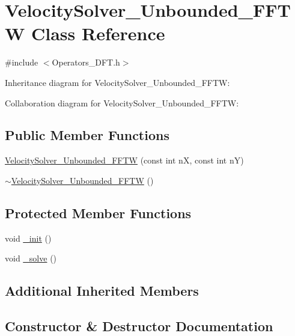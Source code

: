 \hypertarget{class_velocity_solver___unbounded___f_f_t_w}{}\section{Velocity\+Solver\+\_\+\+Unbounded\+\_\+\+F\+F\+T\+W Class Reference}
\label{class_velocity_solver___unbounded___f_f_t_w}


{\ttfamily \#include $<$Operators\+\_\+\+D\+F\+T.\+h$>$}



Inheritance diagram for Velocity\+Solver\+\_\+\+Unbounded\+\_\+\+F\+F\+T\+W\+:


Collaboration diagram for Velocity\+Solver\+\_\+\+Unbounded\+\_\+\+F\+F\+T\+W\+:
\subsection*{Public Member Functions}
\begin{DoxyCompactItemize}
\item 
\hyperlink{class_velocity_solver___unbounded___f_f_t_w_ad8e42aad70fb3e031e64d109097c5cec}{Velocity\+Solver\+\_\+\+Unbounded\+\_\+\+F\+F\+T\+W} (const int n\+X, const int n\+Y)
\item 
\hyperlink{class_velocity_solver___unbounded___f_f_t_w_a0a5e8585f426b49c9cb189bd28173e6f}{$\sim$\+Velocity\+Solver\+\_\+\+Unbounded\+\_\+\+F\+F\+T\+W} ()
\end{DoxyCompactItemize}
\subsection*{Protected Member Functions}
\begin{DoxyCompactItemize}
\item 
void \hyperlink{class_velocity_solver___unbounded___f_f_t_w_a438430f0e53d259baa46539c2ba5acbc}{\+\_\+init} ()
\item 
void \hyperlink{class_velocity_solver___unbounded___f_f_t_w_abe6acc32fcfbcad312a5cecad3bad332}{\+\_\+solve} ()
\end{DoxyCompactItemize}
\subsection*{Additional Inherited Members}


\subsection{Constructor \& Destructor Documentation}
\hypertarget{class_velocity_solver___unbounded___f_f_t_w_ad8e42aad70fb3e031e64d109097c5cec}{}
